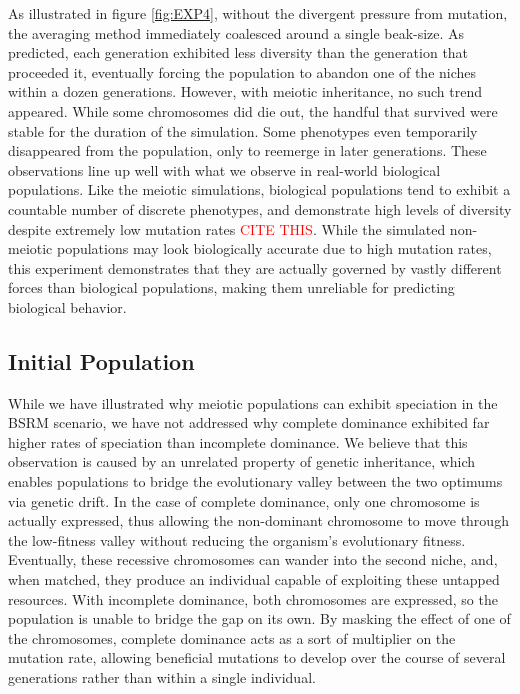 \documentclass{article}
\newcommand\TODO[1]{\textcolor{red}{#1}}
\begin{document}
As illustrated in figure \ref{fig:EXP4}, without the divergent pressure from mutation, the averaging method immediately coalesced around a single beak-size. As predicted, each generation exhibited less diversity than the generation that proceeded it, eventually forcing the population to abandon one of the niches within a dozen generations. However, with meiotic inheritance, no such trend appeared. While some chromosomes did die out, the handful that survived were stable for the duration of the simulation. Some phenotypes even temporarily disappeared from the population, only to reemerge in later generations. These observations line up well with what we observe in real-world biological populations. Like the meiotic simulations, biological populations tend to exhibit a countable number of discrete phenotypes, and demonstrate high levels of diversity despite extremely low mutation rates \TODO{CITE THIS}. While the simulated non-meiotic populations may look biologically accurate due to high mutation rates, this experiment demonstrates that they are actually governed by vastly different forces than biological populations, making them unreliable for predicting biological behavior. 

\subsection{Initial Population}

While we have illustrated why meiotic populations can exhibit speciation in the BSRM scenario, we have not addressed why complete dominance exhibited far higher rates of speciation than incomplete dominance. We believe that this observation is caused by an unrelated property of genetic inheritance, which enables populations to bridge the evolutionary valley between the two optimums via genetic drift. In the case of complete dominance, only one chromosome is actually expressed, thus allowing the non-dominant chromosome to move through the low-fitness valley without reducing the organism’s evolutionary fitness. Eventually, these recessive chromosomes can wander into the second niche, and, when matched, they produce an individual capable of exploiting these untapped resources. With incomplete dominance, both chromosomes are expressed, so the population is unable to bridge the gap on its own. By masking the effect of one of the chromosomes, complete dominance acts as a sort of multiplier on the mutation rate, allowing beneficial mutations to develop over the course of several generations rather than within a single individual. 
\end{document}
